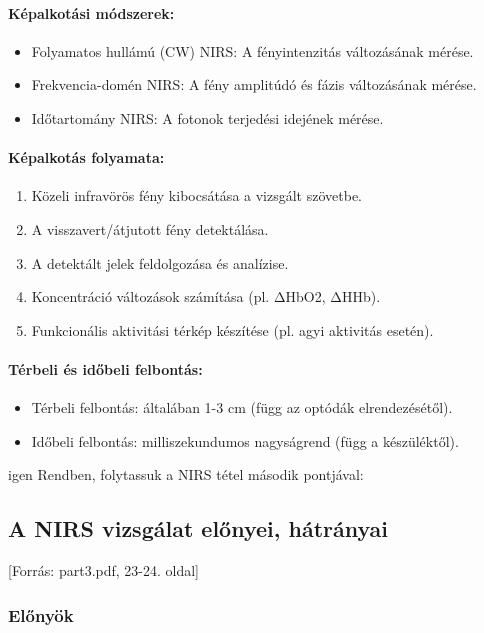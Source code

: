 \documentclass[a4paper,12pt]{article}
\begin{document}
\paragraph{Képalkotási módszerek:} \begin{itemize} \item Folyamatos hullámú (CW) NIRS: A fényintenzitás változásának mérése. \item Frekvencia-domén NIRS: A fény amplitúdó és fázis változásának mérése. \item Időtartomány NIRS: A fotonok terjedési idejének mérése. \end{itemize}

\paragraph{Képalkotás folyamata:} \begin{enumerate} \item Közeli infravörös fény kibocsátása a vizsgált szövetbe. \item A visszavert/átjutott fény detektálása. \item A detektált jelek feldolgozása és analízise. \item Koncentráció változások számítása (pl. ΔHbO2, ΔHHb). \item Funkcionális aktivitási térkép készítése (pl. agyi aktivitás esetén). \end{enumerate}

\paragraph{Térbeli és időbeli felbontás:} \begin{itemize} \item Térbeli felbontás: általában 1-3 cm (függ az optódák elrendezésétől). \item Időbeli felbontás: milliszekundumos nagyságrend (függ a készüléktől). \end{itemize}

igen
Rendben, folytassuk a NIRS tétel második pontjával:

\subsection{A NIRS vizsgálat előnyei, hátrányai} [Forrás: part3.pdf, 23-24. oldal]

\subsubsection{Előnyök}
\end{document}
